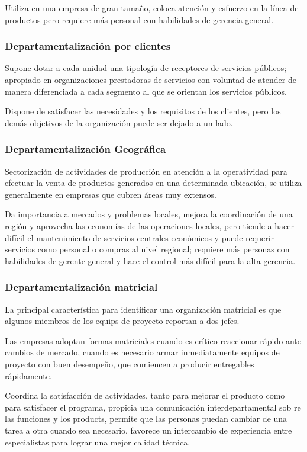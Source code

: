 Utiliza en una empresa de gran tamaño, coloca atención y esfuerzo en la línea de productos pero requiere más personal con habilidades de gerencia general.
\subsubsection{Departamentalización por clientes}
Supone dotar a cada unidad una tipología de receptores de servicios públicos; apropiado en organizaciones prestadoras de servicios con voluntad de atender de manera diferenciada a cada segmento al que se orientan los servicios públicos.

Dispone de satisfacer las necesidades y los requisitos de los clientes, pero los demás objetivos de la organización puede ser dejado a un lado.

\subsubsection{Departamentalización Geográfica}
Sectorización de actividades de producción en atención a la operatividad para efectuar la venta de productos generados en una determinada ubicación, se utiliza generalmente en empresas que cubren áreas muy extensos.

Da importancia a mercados y problemas locales, mejora la coordinación de una región y aprovecha las economías de las operaciones locales, pero tiende a hacer difícil el mantenimiento de servicios centrales económicos y puede requerir servicios como personal o compras al nivel regional; requiere más personas con habilidades de gerente general y hace el control más difícil para la alta gerencia.

\subsubsection{Departamentalización matricial}
La principal característica para identificar una organización matricial es que algunos miembros de los equips de proyecto reportan a dos jefes.

Las empresas adoptan formas matriciales cuando es crítico reaccionar rápido ante cambios de mercado, cuando es necesario armar inmediatamente equipos de proyecto con buen desempeño, que comiencen a producir entregables rápidamente.

Coordina la satisfacción de actividades, tanto para mejorar el producto como para satisfacer el programa, propicia una comunicación interdepartamental sob re las funciones y los products, permite que las personas puedan cambiar de una tarea a otra cuando sea necesario, favorece un intercambio de experiencia entre especialistas para lograr una mejor calidad técnica.

